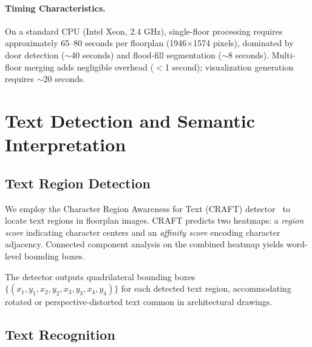 \documentclass[manuscript,screen,review]{acmart}
\begin{document}

\paragraph{Timing Characteristics.}
On a standard CPU (Intel Xeon, 2.4 GHz), single-floor processing requires approximately 65--80 seconds per floorplan (1946$\times$1574 pixels), dominated by door detection ($\sim$40 seconds) and flood-fill segmentation ($\sim$8 seconds). Multi-floor merging adds negligible overhead ($<$1 second); visualization generation requires $\sim$20 seconds.

\section{Text Detection and Semantic Interpretation}
\label{sec:text_detection}

\subsection{Text Region Detection}
\label{subsec:detection}

We employ the Character Region Awareness for Text (CRAFT) detector~\cite{craft} to locate text regions in floorplan images. CRAFT predicts two heatmaps: a \emph{region score} indicating character centers and an \emph{affinity score} encoding character adjacency. Connected component analysis on the combined heatmap yields word-level bounding boxes.


The detector outputs quadrilateral bounding boxes $\{(x_1, y_1, x_2, y_2, x_3, y_3, x_4, y_4)\}$ for each detected text region, accommodating rotated or perspective-distorted text common in architectural drawings.

\subsection{Text Recognition}
\label{subsec:recognition}
\end{document}
